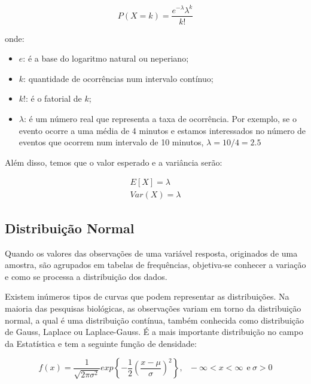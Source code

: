  
\begin{equation}
    P\left(X=k\right)= \frac{e^{-\lambda}\lambda^{k}}{k!}
\end{equation}

onde:

\begin{itemize}
\item $e$: é a base do logaritmo natural ou neperiano;
\item $k$: quantidade de ocorrências num intervalo contínuo;
\item $k!$: é o fatorial de $k$; 
\item $\lambda$: é um número real que representa a taxa de ocorrência. Por exemplo, se o evento ocorre a uma média de 4 minutos e estamos interessados no número de eventos que ocorrem num intervalo de 10 minutos, $\lambda={10}/{4}=2.5$
\end{itemize}

  
Além disso, temos que o valor esperado e a variância serão: 

$$
\begin{aligned}
E\left[X\right] =\lambda \\
Var\left(X\right) = \lambda
\end{aligned}
$$
 


\newpage
\subsection{Distribuição Normal}

\inic Quando os valores das observações de uma variável resposta, originados de uma amostra, são agrupados em tabelas de frequências, objetiva-se conhecer a variação e como se processa a distribuição dos dados.\vskip0.3cm 

\inic Existem inúmeros tipos de curvas que podem representar as distribuições. Na maioria das pesquisas biológicas, as observações variam em torno da distribuição normal, a qual é uma distribuição contínua, também conhecida como distribuição de Gauss, Laplace ou Laplace-Gauss. É a mais importante distribuição no campo da Estatística e tem a seguinte função de densidade:


\begin{equation}
f\left(x\right) = \frac{1}{\sqrt{2\pi \sigma^2}}exp \left\{-\frac{1}{2}\left(\frac{x-\mu}{\sigma}\right)^2 \right\},~~~-\infty<x<\infty~~\text{e}~\sigma>0 
 \end{equation}



